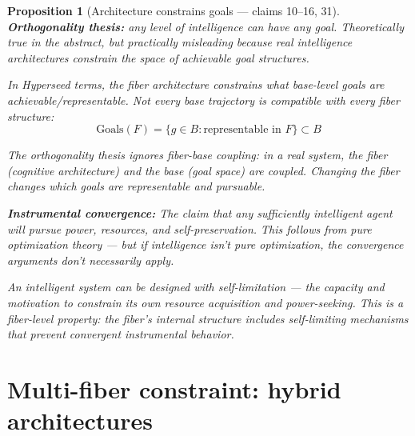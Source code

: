 \documentclass[11pt,a4paper]{article}
\newtheorem{proposition}[definition]{Proposition}
\begin{document}
\begin{proposition}[Architecture constrains goals --- claims 10--16, 31]
\label{prop:coupling}
\textbf{Orthogonality thesis:} any level of intelligence can have any goal.
Theoretically true in the abstract, but practically misleading because
real intelligence architectures constrain the space of achievable goal
structures.

In Hyperseed terms, the fiber architecture constrains what base-level
goals are achievable/representable. Not every base trajectory is compatible
with every fiber structure:
\[
  \text{Goals}(F) = \{g \in B : \text{representable in } F\}
  \subset B
\]

The orthogonality thesis ignores fiber-base coupling: in a real system,
the fiber (cognitive architecture) and the base (goal space) are coupled.
Changing the fiber changes which goals are representable and pursuable.

\textbf{Instrumental convergence:} The claim that any sufficiently
intelligent agent will pursue power, resources, and self-preservation.
This follows from pure optimization theory --- but if intelligence isn't
pure optimization, the convergence arguments don't necessarily apply.

An intelligent system can be designed with \emph{self-limitation} --- the
capacity and motivation to constrain its own resource acquisition and
power-seeking. This is a fiber-level property: the fiber's internal
structure includes self-limiting mechanisms that prevent convergent
instrumental behavior.
\end{proposition}

\section{Multi-fiber constraint: hybrid architectures}
\label{sec:hybrid}
\end{document}
